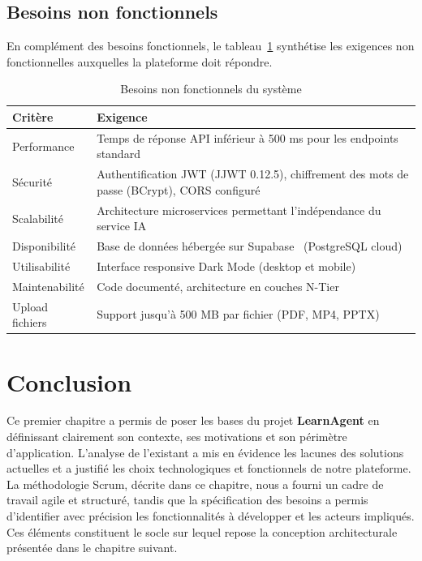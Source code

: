 \documentclass[12pt,a4paper]{report}
\begin{document}
\subsection{Besoins non fonctionnels}

En complément des besoins fonctionnels, le tableau~\ref{tab:non_fonctionnels} synthétise les exigences non fonctionnelles auxquelles la plateforme doit répondre.

\begin{table}[H]
\centering
\caption{Besoins non fonctionnels du système}
\label{tab:non_fonctionnels}
\begin{tabularx}{\textwidth}{|l|X|}
\hline
\textbf{Critère} & \textbf{Exigence} \\
\hline
Performance & Temps de réponse API inférieur à 500 ms pour les endpoints standard \\
\hline
Sécurité & Authentification JWT (JJWT 0.12.5), chiffrement des mots de passe (BCrypt), CORS configuré \\
\hline
Scalabilité & Architecture microservices permettant l'indépendance du service IA \\
\hline
Disponibilité & Base de données hébergée sur Supabase~\cite{supabase} (PostgreSQL cloud) \\
\hline
Utilisabilité & Interface responsive Dark Mode (desktop et mobile) \\
\hline
Maintenabilité & Code documenté, architecture en couches N-Tier \\
\hline
Upload fichiers & Support jusqu'à 500 MB par fichier (PDF, MP4, PPTX) \\
\hline
\end{tabularx}
\end{table}

\section*{Conclusion}

Ce premier chapitre a permis de poser les bases du projet \textbf{LearnAgent} en définissant clairement son contexte, ses motivations et son périmètre d'application. L'analyse de l'existant a mis en évidence les lacunes des solutions actuelles et a justifié les choix technologiques et fonctionnels de notre plateforme. La méthodologie Scrum, décrite dans ce chapitre, nous a fourni un cadre de travail agile et structuré, tandis que la spécification des besoins a permis d'identifier avec précision les fonctionnalités à développer et les acteurs impliqués. Ces éléments constituent le socle sur lequel repose la conception architecturale présentée dans le chapitre suivant.
\end{document}
